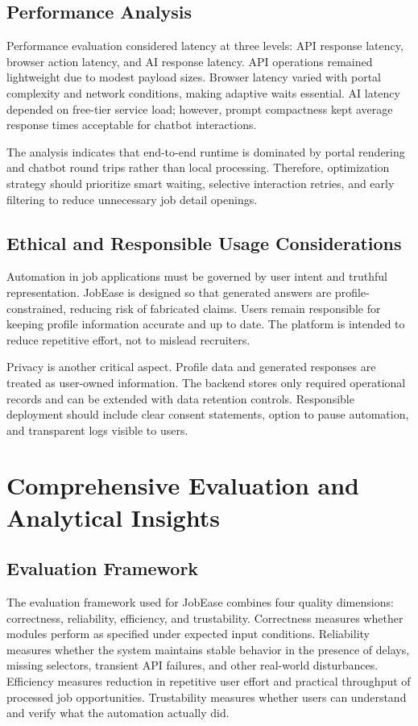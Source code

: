 \documentclass[12pt,a4paper,oneside]{report}
\begin{document}
\section{Performance Analysis}
Performance evaluation considered latency at three levels: API response latency, browser action latency, and AI response latency. API operations remained lightweight due to modest payload sizes. Browser latency varied with portal complexity and network conditions, making adaptive waits essential. AI latency depended on free-tier service load; however, prompt compactness kept average response times acceptable for chatbot interactions.

The analysis indicates that end-to-end runtime is dominated by portal rendering and chatbot round trips rather than local processing. Therefore, optimization strategy should prioritize smart waiting, selective interaction retries, and early filtering to reduce unnecessary job detail openings.

\section{Ethical and Responsible Usage Considerations}
Automation in job applications must be governed by user intent and truthful representation. JobEase is designed so that generated answers are profile-constrained, reducing risk of fabricated claims. Users remain responsible for keeping profile information accurate and up to date. The platform is intended to reduce repetitive effort, not to mislead recruiters.

Privacy is another critical aspect. Profile data and generated responses are treated as user-owned information. The backend stores only required operational records and can be extended with data retention controls. Responsible deployment should include clear consent statements, option to pause automation, and transparent logs visible to users.

\chapter{Comprehensive Evaluation and Analytical Insights}
\section{Evaluation Framework}
The evaluation framework used for JobEase combines four quality dimensions: correctness, reliability, efficiency, and trustability. Correctness measures whether modules perform as specified under expected input conditions. Reliability measures whether the system maintains stable behavior in the presence of delays, missing selectors, transient API failures, and other real-world disturbances. Efficiency measures reduction in repetitive user effort and practical throughput of processed job opportunities. Trustability measures whether users can understand and verify what the automation actually did.
\end{document}
